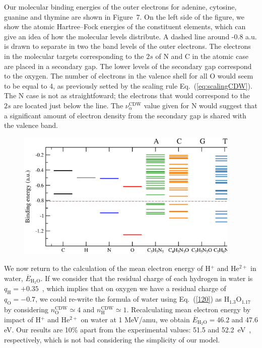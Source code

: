\documentclass[preprint,12pt]{article}
\begin{document}
Our molecular binding energies of the outer electrons for adenine, 
cytosine, guanine and thymine are shown in Figure~7. On the left side 
of the figure, we show the atomic Hartree--Fock energies of the 
constituent elements, which can give an idea of how the molecular levels 
distribute. A dashed line around -0.8 a.u. is drawn to separate in two 
the band levels of the outer electrons. The electrons in the molecular 
targets corresponding to the $2s$ of N and C in the atomic case are 
placed in a secondary gap. The lower levels of the secondary gap 
correspond to the oxygen. The number of electrons in the valence 
shell for all O would seem to be equal to 4, as previously setted by the 
scaling rule Eq.~(\ref{eq:scalingCDW}). The N case is not as straightfoward;
the electrons that would correspond to the $2s$ are located just below
the line. The $\nu_{\alpha }^{\text{CDW}}$ value given for N would 
suggest that a significant amount of electron density from the secondary gap 
is shared with the valence band.

\begin{figure}[H]
\centering
\includegraphics[width=0.95\textwidth]{energylevels/DNA.eps}
\end{figure}


We now return to the calculation of the mean electron energy of H$^{+}$ 
and He$^{2+}$ in water, $\overline{E}_{\text{H}_2\text{O}}$. If we 
consider that the residual charge of each hydrogen in water is 
$q_{\text{H}}=+0.35$~\cite{rappe1991}, which implies that on oxygen we have a 
residual charge of $q_{\text{O}}=-0.7$, we could re-write the formula of water 
using Eq.~(\ref{120}) as H$_{1.3}$O$_{1.17}$ by considering 
$n_{\text{O}}^{\text{CDW}}\simeq 4$ and 
$n_{\text{H}}^{\text{CDW}}\simeq 1$. Recalculating mean electron energy 
by impact of H$^{+}$ and He$^{2+}$ on water at 1 MeV/amu, we obtain
$\overline{E}_{\text{H}_2\text{O}}=46.2$ and 47.6 eV. Our results 
are 10\% apart from the experimental values: 51.5 and 
52.2~eV~\cite{pimblott2007}, respectively, which is not bad considering 
the simplicity of our model.
\end{document}
